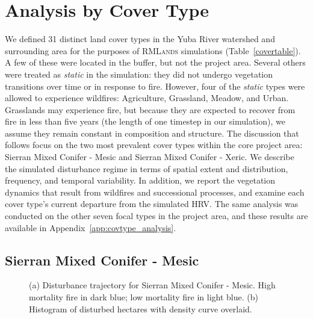 
\chapter{Analysis by Cover Type}
\label{ch:covtype}
We defined 31 distinct land cover types in the Yuba River watershed and surrounding area for the purposes of \textsc{RMLands} simulations (Table~\ref{covertable}). A few of these were located in the buffer, but not the project area. Several others were treated as \emph{static} in the simulation: they did not undergo vegetation transitions over time or in response to fire. However, four of the \emph{static} types were allowed to experience wildfires: Agriculture, Grassland, Meadow, and Urban. Grasslands may experience fire, but because they are expected to recover from fire in less than five years (the length of one timestep in our simulation), we assume they remain constant in composition and structure. The discussion that follows focus on the two most prevalent cover types within the core project area: Sierran Mixed Conifer - Mesic and Sierran Mixed Conifer - Xeric. We describe the simulated disturbance regime in terms of spatial extent and distribution, frequency, and temporal variability. In addition, we report the vegetation dynamics that result from wildfires and successional processes, and examine each cover type's current departure from the simulated HRV. The same analysis was conducted on the other seven focal types in the project area, and these results are available in Appendix~\ref{app:covtype_analysis}.






\section{Sierran Mixed Conifer - Mesic} 

\begin{figure}[!htbp]
  \centering
  \caption{\small (a) Disturbance trajectory for Sierran Mixed Conifer - Mesic. High mortality fire in dark blue; low mortality fire in light blue. (b) Histogram of disturbed hectares with density curve overlaid.} 
  \label{fig:darea_smcm}
\end{figure}

